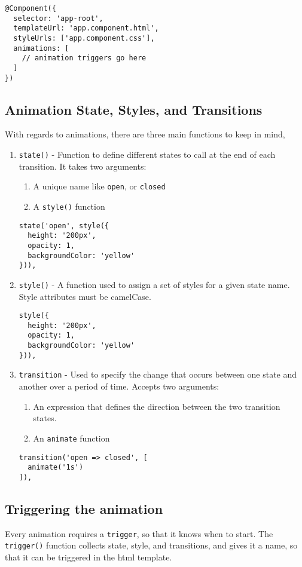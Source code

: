 \begin{lstlisting}
@Component({
  selector: 'app-root',
  templateUrl: 'app.component.html',
  styleUrls: ['app.component.css'],
  animations: [
    // animation triggers go here
  ]
})  
\end{lstlisting}

\subsection{ Animation State, Styles, and Transitions }
With regards to animations, there are three main functions to keep in mind, 
\begin{enumerate}
  \item \lstinline{state()} - Function to define different states to call at 
  the end of each transition. It takes two arguments: 
    \begin{enumerate}
      \item A unique name like \lstinline{open}, or \lstinline{closed}
      \item A \lstinline{style()} function 
    \end{enumerate}
    \begin{lstlisting}  
state('open', style({
  height: '200px',
  opacity: 1,
  backgroundColor: 'yellow'
})),
    \end{lstlisting}  
  \item \lstinline{style()} - A function used to assign a set of styles for 
  a given state name. Style attributes must be camelCase.
    \begin{lstlisting}
style({
  height: '200px',
  opacity: 1,
  backgroundColor: 'yellow'
})),
    \end{lstlisting}
  \item \lstinline{transition} - Used to specify the change that occurs 
  between one state and another over a period of time. Accepts two arguments: 
    \begin{enumerate}
      \item An expression that defines the direction between the two 
      transition states. 
      \item An \lstinline{animate} function
    \end{enumerate}
    \begin{lstlisting}
transition('open => closed', [
  animate('1s')
]),
    \end{lstlisting}
\end{enumerate}

\subsection{Triggering the animation}
Every animation requires a \lstinline{trigger}, so that it knows when to start. 
The \lstinline{trigger()} function collects state, style, and transitions,
and gives it a name, so that it can be triggered in the html template. 

